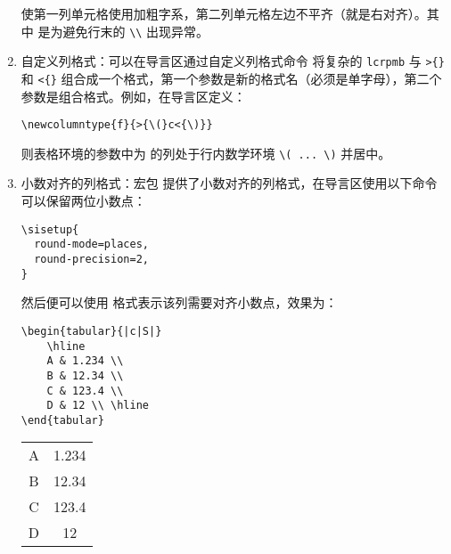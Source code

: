 \begin{enumerate}
使第一列单元格使用加粗字系，第二列单元格左边不平齐（就是右对齐）。其中 \boxforcmd{\\arraybackslash} 是为避免行末的 \verb|\\| 出现异常。

\item 自定义列格式：可以在导言区通过自定义列格式命令 \boxforcmd{\\newcolumntype{}{}} 将复杂的 \verb|lcrpmb| 与 \verb|>{}| 和 \verb|<{}| 组合成一个格式，第一个参数是新的格式名（必须是单字母），第二个参数是组合格式。例如，在导言区定义：

\begin{tcolorbox}
\begin{lstlisting}
\newcolumntype{f}{>{\(}c<{\)}}
\end{lstlisting}
\end{tcolorbox}

则表格环境的参数中为  的列处于行内数学环境 \verb|\( ... \)| 并居中。

\item 小数对齐的列格式：宏包  提供了小数对齐的列格式，在导言区使用以下命令可以保留两位小数点：

\begin{tcolorbox}
\begin{lstlisting}
\sisetup{
  round-mode=places,
  round-precision=2,
}
\end{lstlisting}
\end{tcolorbox}

然后便可以使用  格式表示该列需要对齐小数点，效果为：

\begin{tcolorbox}[sidebyside]
\begin{lstlisting}
\begin{tabular}{|c|S|} 
    \hline
    A & 1.234 \\
    B & 12.34 \\
    C & 123.4 \\
    D & 12 \\ \hline 
\end{tabular}
\end{lstlisting} 

\tcblower

\begin{tabular}{|c|S|} 
    \hline
    A & 1.234 \\
    B & 12.34 \\
    C & 123.4 \\
    D & 12 \\
    \hline 
\end{tabular}
\end{tcolorbox}


\end{enumerate}
